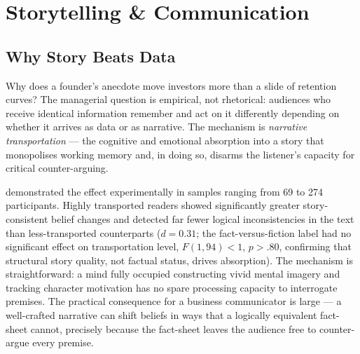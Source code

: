 \chapter{Storytelling \& Communication}\label{ch:storytelling-communication}


\section{Why Story Beats Data}\label{sec:narrative-transportation}

Why does a founder's anecdote move investors more than a slide of retention curves? The
managerial question is empirical, not rhetorical: audiences who receive identical information
remember and act on it differently depending on whether it arrives as data or as narrative.
The mechanism is \emph{narrative transportation} — the cognitive and emotional absorption
into a story that monopolises working memory and, in doing so, disarms the listener's
capacity for critical counter-arguing.

\textcite{green2000narrative} demonstrated the effect experimentally in samples ranging
from \num{69} to \num{274} participants. Highly transported readers showed significantly
greater story-consistent belief changes and detected far fewer logical inconsistencies in
the text than less-transported counterparts (\(d = 0.31\); %
the fact-versus-fiction label had no significant effect on transportation level,
\(F(1,94) < 1\), \(p > .80\), confirming that structural story quality, not factual
status, drives absorption). The mechanism is straightforward: a mind fully occupied
constructing vivid mental imagery and tracking character motivation has no spare processing
capacity to interrogate premises. The practical consequence for a business communicator is
large — a well-crafted narrative can shift beliefs in ways that a logically equivalent
fact-sheet cannot, precisely because the fact-sheet leaves the audience free to counter-argue
every premise.

